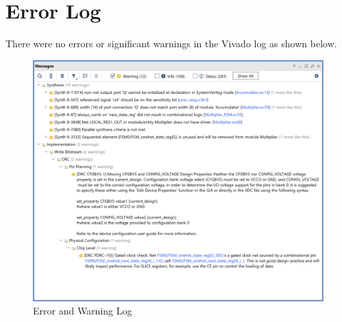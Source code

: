 \documentclass[12pt]{article}
\begin{document}
\newpage

\section{Error Log}

There were no errors or significant warnings in the Vivado log as shown below.

\begin{figure}[h]
    \centering
    \includegraphics[width=.8\textwidth]{Figures/CPE 133 Lab 7 Error Log.png}
    \caption{Error and Warning Log}
    \label{fig:warninglog}
\end{figure}
\end{document}
